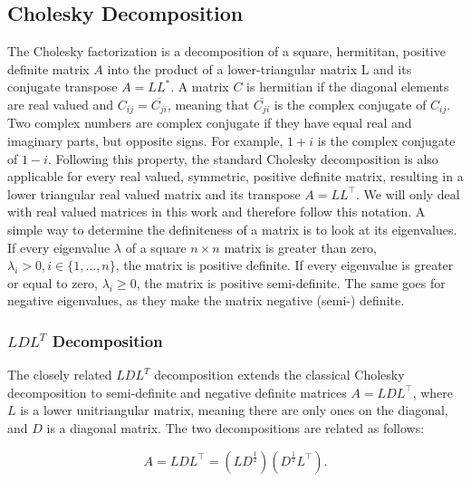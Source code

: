 \subsection{Cholesky Decomposition}\label{sec:cholesky}

The Cholesky factorization is a decomposition of a square, hermititan,
positive definite matrix $A$ into the product of a lower-triangular
matrix L and its conjugate transpose $A = L L^*$. A matrix $C$ is
hermitian if the diagonal elements are real valued and $C_{ij} =
\overline{C_{ji}}$, meaning that $\overline{C_{ji}}$ is the complex
conjugate of $C_{ij}$. Two complex numbers are complex conjugate if they
have equal real and imaginary parts, but opposite signs. For example,
$1+i$ is the complex conjugate of $1-i$. Following this property, the
standard Cholesky decomposition is also applicable for every real
valued, symmetric, positive definite matrix, resulting in a lower
triangular real valued matrix and its transpose $A = L L^\top$. We
will only deal with real valued matrices in this work and therefore
follow this notation. A simple way to determine the definiteness of a
matrix is to look at its eigenvalues. If every eigenvalue $\lambda$ of a
square $n \times n$ matrix is greater than zero, $\lambda_{i} > 0, i \in
\{1,\dots,n\}$, the matrix is positive definite. If every eigenvalue is
greater or equal to zero, $\lambda_{i} \ge 0$, the matrix is positive
semi-definite. The same goes for negative eigenvalues, as they make the
matrix negative (semi-) definite.

\subsubsection{$LDL^T$ Decomposition}

The closely related $LDL^T$ decomposition extends the classical Cholesky
decomposition to semi-definite and negative definite matrices $A = L D
L^\top$, where $L$ is a lower unitriangular matrix, meaning there are
only ones on the diagonal, and $D$ is a diagonal matrix. The two
decompositions are related as follows:

\begin{equation}\label{eq:LDL}
  A = LDL^\top = (L D^\frac{1}{2}) (D^\frac{1}{2}  L^\top).
\end{equation}

